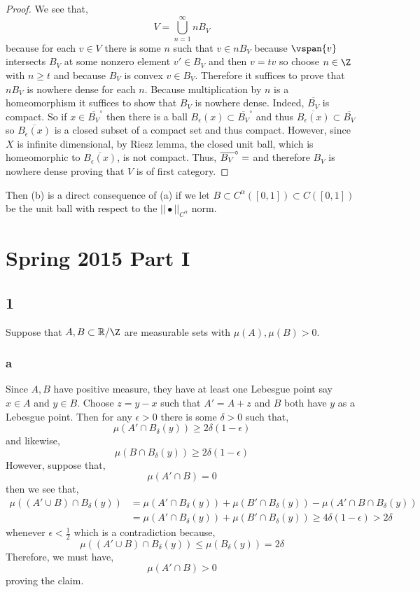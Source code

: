 \documentclass[12pt]{article}
\newcommand{\R}{\mathbb{R}}
\begin{document}
\begin{proof}
We see that,
\[ V = \bigcup_{n = 1}^\infty n B_V \]
because for each $v \in V$ there is some $n$ such that $v \in n B_V$ because $\vspan{v}$ intersects  $B_V$ at some nonzero element $v' \in B_V$ and then $v = t v$ so choose $n \in \Z$ with $n \ge t$ and because $B_V$ is convex $v \in B_V$.
Therefore it suffices to prove that $n B_V$ is nowhere dense for each $n$. Because multiplication by $n$ is a homeomorphism it suffices to show that $B_V$ is nowhere dense. Indeed, $\overline{B_V}$ is compact. So if $x \in \overline{B_V}^\circ$ then there is a ball $B_\epsilon(x) \subset \overline{B_V}^\circ$ and thus $\overline{B_\epsilon(x)} \subset \overline{B_V}$ so $\overline{B_\epsilon(x)}$ is a closed subset of a compact set and thus compact. However, since $X$ is infinite dimensional, by Riesz lemma, the closed unit ball, which is homeomorphic to $\overline{B_\epsilon(x)}$, is not compact. Thus, $\overline{B_V}^\circ = \empty$ and therefore $B_V$ is nowhere dense proving that $V$ is of first category.
\end{proof}

Then (b) is a direct consequence of (a) if we let $B \subset C^\alpha([0,1]) \subset C([0,1])$ be the unit ball with respect to the $|| \bullet ||_{C^\alpha}$ norm.



\section{Spring 2015 Part I}

\subsection{1}

Suppose that $A, B \subset \R / \Z$ are measurable sets with $\mu(A), \mu(B) > 0$.

\subsubsection{a}

Since $A, B$ have positive measure, they have at least one Lebesgue point say $x \in A$ and $y \in B$. Choose $z = y - x$ such that $A' = A + z$ and $B$ both have $y$ as a Lebesgue point. Then for any $\epsilon > 0$ there is some $\delta > 0$ such that,
\[ \mu(A' \cap B_\delta(y)) \ge 2 \delta (1 - \epsilon) \]
and likewise,
\[ \mu(B \cap B_\delta(y)) \ge 2 \delta(1 - \epsilon) \]
However, suppose that,
\[ \mu(A' \cap B) = 0 \]
then we see that,
\begin{align*}
\mu((A' \cup B) \cap B_\delta(y)) & = \mu(A' \cap B_\delta(y)) + \mu(B' \cap B_\delta(y)) - \mu(A' \cap B \cap B_\delta(y)) 
\\
& = \mu(A' \cap B_\delta(y)) + \mu(B' \cap B_\delta(y)) \ge 4 \delta( 1 - \epsilon) > 2 \delta 
\end{align*}
whenever $\epsilon < \tfrac{1}{2}$ which is a contradiction because,
\[ \mu((A' \cup B) \cap B_\delta(y)) \le \mu(B_\delta(y)) = 2 \delta \]
Therefore, we must have,
\[ \mu(A' \cap B) > 0 \]
proving the claim.
\end{document}
